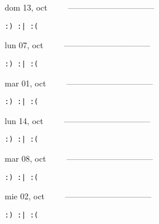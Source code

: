 \documentclass[letterpaper,10pt]{article}
\begin{document}
\begin{multicols}{3}
{dom 13, oct\ \ \ \ \ --------------------------------}
\begin{flushright}\begin{small}\texttt{:) :| :(}\end{small}\end{flushright}
\vfill
{lun 07, oct\ \ \ \ \ --------------------------------}
\begin{flushright}\begin{small}\texttt{:) :| :(}\end{small}\end{flushright}\par
\vfill
{mar 01, oct\ \ \ \ \ --------------------------------}
\begin{flushright}\begin{small}\texttt{:) :| :(}\end{small}\end{flushright}\par
\vfill
\end{multicols}
\vspace{1.05cm}

\begin{multicols}{3}
{lun 14, oct\ \ \ \ \ --------------------------------}
\begin{flushright}\begin{small}\texttt{:) :| :(}\end{small}\end{flushright}
\vfill
{mar 08, oct\ \ \ \ \ --------------------------------}
\begin{flushright}\begin{small}\texttt{:) :| :(}\end{small}\end{flushright}\par
\vfill
{mie 02, oct\ \ \ \ \ --------------------------------}
\begin{flushright}\begin{small}\texttt{:) :| :(}\end{small}\end{flushright}\par
\vfill
\end{multicols}
\vspace{1.05cm}
\end{document}
